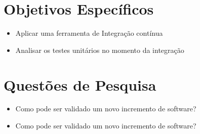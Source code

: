 \section{Objetivos Específicos }
\begin{itemize}
    \item Aplicar uma ferramenta de Integração contínua
    \item Analisar os testes unitários no momento da integração
\end{itemize}
\section{Questões de Pesquisa}
\begin{itemize}
    \item Como pode ser validado um novo incremento de software?
    \item Como pode ser validado um novo incremento de software?
\end{itemize}
